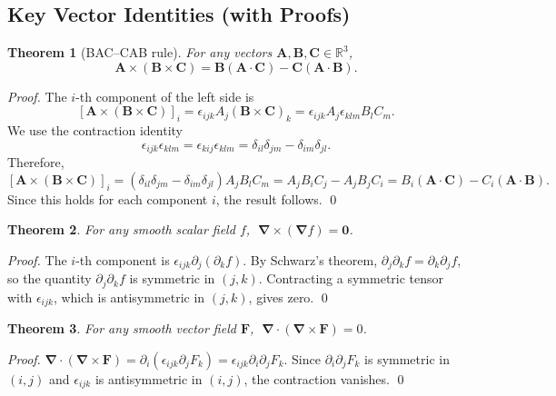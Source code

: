 \documentclass[12pt,a4paper]{article}
\theoremstyle{plain}
\newtheorem{theorem}{Theorem}[section]
\theoremstyle{definition}
\theoremstyle{remark}
\newcommand{\R}{\mathbb{R}}
\newcommand{\ve}[1]{\mathbf{#1}}           %
\newcommand{\nab}{\boldsymbol{\nabla}}
\begin{document}
\subsection{Key Vector Identities (with Proofs)}

\begin{theorem}[BAC--CAB rule]\label{thm:baccab}
For any vectors $\ve{A},\ve{B},\ve{C}\in\R^3$,
\[
  \ve{A}\times(\ve{B}\times\ve{C}) = \ve{B}(\ve{A}\cdot\ve{C}) - \ve{C}(\ve{A}\cdot\ve{B}).
\]
\end{theorem}
\begin{proof}
The $i$-th component of the left side is
\[
  [\ve{A}\times(\ve{B}\times\ve{C})]_i
  = \epsilon_{ijk}A_j(\ve{B}\times\ve{C})_k
  = \epsilon_{ijk}A_j\epsilon_{klm}B_lC_m.
\]
We use the contraction identity
\[
  \epsilon_{ijk}\epsilon_{klm} = \epsilon_{kij}\epsilon_{klm} = \delta_{il}\delta_{jm}-\delta_{im}\delta_{jl}.
\]
Therefore,
\[
  [\ve{A}\times(\ve{B}\times\ve{C})]_i
  = (\delta_{il}\delta_{jm}-\delta_{im}\delta_{jl})A_jB_lC_m
  = A_jB_iC_j - A_jB_jC_i
  = B_i(\ve{A}\cdot\ve{C}) - C_i(\ve{A}\cdot\ve{B}).
\]
Since this holds for each component $i$, the result follows. \qed
\end{proof}

\begin{theorem}\label{thm:curlgrad}
For any smooth scalar field $f$, $\;\nab\times(\nab f) = \ve{0}$.
\end{theorem}
\begin{proof}
The $i$-th component is $\epsilon_{ijk}\partial_j(\partial_k f)$. By Schwarz's theorem, $\partial_j\partial_k f = \partial_k\partial_j f$, so the quantity $\partial_j\partial_k f$ is symmetric in $(j,k)$. Contracting a symmetric tensor with $\epsilon_{ijk}$, which is antisymmetric in $(j,k)$, gives zero. \qed
\end{proof}

\begin{theorem}\label{thm:divcurl}
For any smooth vector field $\ve{F}$, $\;\nab\cdot(\nab\times\ve{F}) = 0$.
\end{theorem}
\begin{proof}
$\nab\cdot(\nab\times\ve{F}) = \partial_i(\epsilon_{ijk}\partial_j F_k) = \epsilon_{ijk}\partial_i\partial_j F_k$. Since $\partial_i\partial_j F_k$ is symmetric in $(i,j)$ and $\epsilon_{ijk}$ is antisymmetric in $(i,j)$, the contraction vanishes. \qed
\end{proof}
\end{document}
